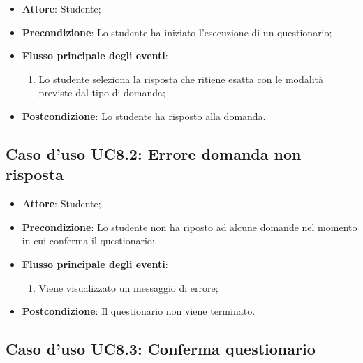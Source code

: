 \documentclass[12pt,a4paper]{article}
\begin{document}
\begin{itemize}

\item \textbf{Attore}: Studente; 
\item \textbf{Precondizione}: Lo studente ha iniziato l'esecuzione di un questionario;

\item \textbf{Flusso principale degli eventi}:
\begin{enumerate}
	\item Lo studente seleziona la risposta che ritiene esatta con le modalità previste dal tipo di domanda;
	
\end{enumerate}
\item \textbf{Postcondizione}: Lo studente ha risposto alla domanda.
\end{itemize}
\hypertarget{UC8.2}{}
\subsection{Caso d'uso UC8.2: Errore domanda non risposta}

\begin{itemize}

\item \textbf{Attore}: Studente; 
\item \textbf{Precondizione}: Lo studente non ha riposto ad alcune domande nel momento in cui conferma il questionario;

\item \textbf{Flusso principale degli eventi}:
\begin{enumerate}
	\item Viene visualizzato un messaggio di errore;
	
\end{enumerate}
\item \textbf{Postcondizione}: Il questionario non viene terminato.
\end{itemize}
\hypertarget{UC8.3}{}
\subsection{Caso d'uso UC8.3: Conferma  questionario}
\end{document}
